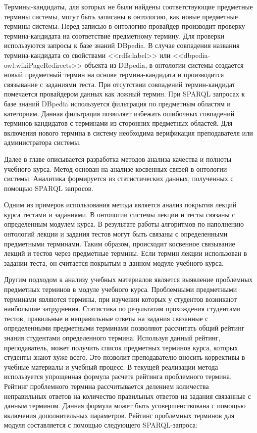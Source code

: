 Термины-кандидаты, для которых не были найдены соответствующие предметные термины системы, могут быть записаны в онтологию, как новые предметные термины системы. Перед записью в онтологию провайдер производит проверку термина-кандидата на соответствие предметному термину. Для проверки используются запросы к базе знаний DBpedia. В случае совпадения названия термина-кандидата со свойствами <<rdfs:label>> или <<dbpedia-owl:wikiPageRedirects>> объекта из DBpedia, в онтологии системы создается новый предметный термин на основе термина-кандидата и производится связывание с заданиями теста. При отсутствии совпадений термин-кандидат помечается провайдером данных как ложный термин. При SPARQL запросах к базе знаний DBpedia используется фильтрация по предметным областям и категориям. Данная фильтрация позволяет избежать ошибочных совпадений терминов-кандидатов с терминами из сторонних предметных областей. Для включения нового термина в систему необходима верификация преподавателя или администратора системы. 

Далее в главе описывается разработка методов анализа качества и полноты учебного курса. Метод основан на анализе косвенных связей в онтологии системы. Аналитика формируется из статистических данных, полученных с помощью SPARQL запросов. 

Одним из примеров использования метода является анализ покрытия лекций курса тестами и заданиями. В онтологии системы лекции и тесты связаны с определенным модулем курса. В результате работы алгоритмов по наполнению онтологий лекции и задания тестов могут быть связаны с определенными предметными терминами. Таким образом, происходит косвенное связывание лекций и тестов через предметные термины. Если термин лекции использован в задании теста, он считается покрытым в данном модуле учебного курса.

Другим подходом к анализу учебных материалов является выявление проблемных предметных терминов в модуле учебного курса. Проблемными предметными терминами являются термины, при изучении которых у студентов возникают наибольшие затруднения. Статистика по результатам прохождения студентами тестов, правильные и неправильные ответы на задания связанные с определенными предметными терминами позволяют рассчитать общий рейтинг знания студентами определенного термина. Используя данный рейтинг, преподаватель, может получить список предметных терминов курса, которых студенты знают хуже всего. Это позволит преподавателю вносить коррективы в учебные материалы и учебный процесс. В текущей реализации метода используется упрощенная формула расчета рейтинга проблемного термина. Рейтинг проблемного термина рассчитывается делением количества неправильных ответов на количество правильных ответов на задания связанные с данным термином. Данная формула может быть усовершенствована с помощью включения дополнительных параметров. Рейтинг проблемных терминов для модуля составляется с помощью следующего  SPARQL-запроса:

